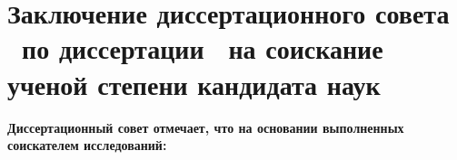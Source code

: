 %







\section{Заключение диссертационного совета \ по диссертации \thesisAuthorLastNameFrom\ на соискание ученой степени кандидата наук}



\textbf{Диссертационный совет отмечает, что на основании выполненных соискателем исследований:}







